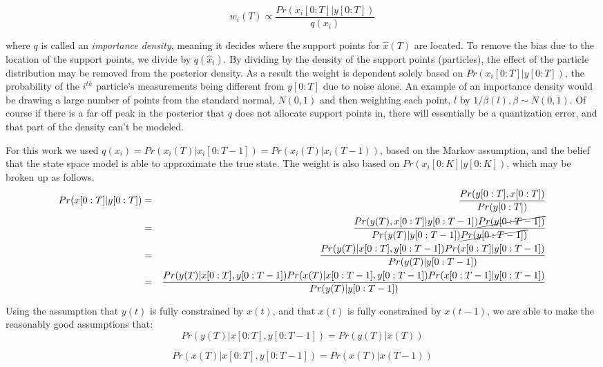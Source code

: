 \documentclass{article}
\begin{document}
\begin{equation}
\label{weightfunc}
w_i(T) \propto \frac{Pr(x_i[0:T] | y[0:T])}{q(x_i)}
\end{equation}

where $q$ is called an \emph{importance density}, meaning it decides where
the support points for $\hat{x}(T)$ are located. To remove the bias due to the
location of the support points, we divide by $q(\hat{x}_i)$. By dividing by 
the density of the support points (particles), the effect of the particle 
distribution may be removed from the posterior density. As a result the weight
is dependent solely based
on $Pr(x_i[0:T] | y[0:T])$, the probability of the $i^{th}$ particle's measurements
being different from $y[0:T]$ due to noise alone.
An example of an importance density would be drawing a large
number of points from the standard normal, $N(0,1)$ and then weighting each point, $l$ by 
$1/\beta(l), \beta \sim N(0,1)$. Of course if there is a far off peak in
the posterior that $q$ does not allocate support points in, there will essentially
be a quantization error, and that part of the density can't be modeled. 

For this work we used $q(x_i) = Pr(x_i(T) | x_i[0:T-1]) = Pr(x_i(T) | x_i(T-1))$,
based on the Markov assumption, and the belief that the state space model is 
able to approximate the true state. The weight is also based on $Pr(x_i[0:K] | y[0:K])$,
which may be broken up as follows.
\begin{eqnarray}
Pr(x[0:T] | y[0:T]) & = & \frac{Pr(y[0:T], x[0:T])}{Pr(y[0:T])} \nonumber \\
 & = & \frac{Pr(y(T), x[0:T] | y[0:T-1]) \cancel{Pr(y[0:T-1])}}{Pr(y(T) | y[0:T-1]) \cancel{Pr(y[0:T-1])}} \nonumber \\
 & = & \frac{Pr(y(T)| x[0:T], y[0:T-1]) Pr(x[0:T] | y[0:T-1])}{Pr(y(T) | y[0:T-1]) } \nonumber \\
 & = & \frac{Pr(y(T)| x[0:T], y[0:T-1]) Pr(x(T) | x[0:T-1], y[0:T-1]) Pr(x[0:T-1] | y[0:T-1])}{Pr(y(T) | y[0:T-1])} \nonumber \\
\end{eqnarray}

Using the assumption that $y(t)$ is fully constrained by $x(t)$,
and that $x(t)$ is fully constrained by $x(t-1)$, we are able to
make the reasonably good assumptions that:
\begin{equation}
Pr(y(T) | x[0:T], y[0:T-1]) = Pr(y(T) | x(T))
\end{equation}

\begin{equation}
Pr(x(T) | x[0:T], y[0:T-1]) = Pr(x(T) | x(T-1))
\end{equation}
\end{document}

